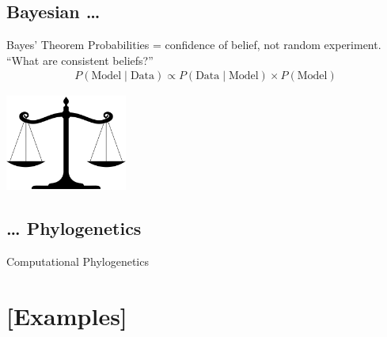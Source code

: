 \documentclass[9pt]{beamer}
\begin{document}
\subsection{Bayesian …}
\begin{frame}{Bayes' Theorem}
  Probabilities = confidence of belief, not random experiment.
  “What are consistent beliefs?”
  \begin{align}
    P(\text{Model} \mid \text{Data}) \propto P(\text{Data} \mid \text{Model}) \times P(\text{Model})
  \end{align}
  \begin{center}
    \includegraphics[width=0.3\textwidth]{scale.png}
  \end{center}
\end{frame}
\subsection{… Phylogenetics}
\begin{frame}{Computational Phylogenetics}
\end{frame}
\section{[Examples]}
\end{document}
